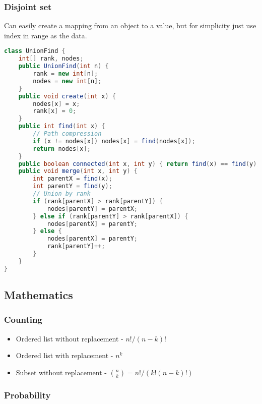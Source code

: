 \documentclass[10pt]{article}
\begin{document}
\subsubsection{Disjoint set}
Can easily create a mapping from an object to a value, but for simplicity just use index in range as the data.
\begin{lstlisting}[language=java]
class UnionFind {
    int[] rank, nodes;
    public UnionFind(int n) {
        rank = new int[n];
        nodes = new int[n];
    }
    public void create(int x) {
        nodes[x] = x;
        rank[x] = 0;
    }
    public int find(int x) {
        // Path compression
        if (x != nodes[x]) nodes[x] = find(nodes[x]);
        return nodes[x];
    }
    public boolean connected(int x, int y) { return find(x) == find(y); }
    public void merge(int x, int y) {
        int parentX = find(x);
        int parentY = find(y);
        // Union by rank
        if (rank[parentX] > rank[parentY]) {
            nodes[parentY] = parentX;
        } else if (rank[parentY] > rank[parentX]) {
            nodes[parentX] = parentY;
        } else {
            nodes[parentX] = parentY;
            rank[parentY]++;
        }
    }
}
\end{lstlisting}

\subsection{Mathematics}
\subsubsection{Counting}
\begin{itemize}
    \item Ordered list without replacement - $n!/(n-k)!$
    \item Ordered list with replacement - $n^k$
    \item Subset without replacement - $\binom{n}{k} = n!/(k!(n-k)!)$
\end{itemize}
\subsubsection{Probability}
\end{document}
